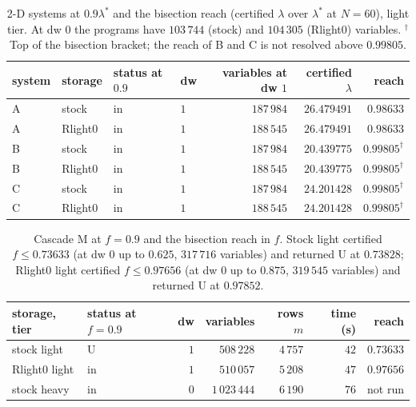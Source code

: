 \begin{table}[h]\centering\scriptsize
\setlength{\tabcolsep}{4pt}
\begin{tabular}{llllrrr}
\toprule
system & storage & status at $0.9$ & dw & variables at dw $1$ & certified $\lambda$ & reach \\
\midrule
A & stock & in & $1$ & $187\,984$ & $26.479491$ & $0.98633$ \\
A & Rlight0 & in & $1$ & $188\,545$ & $26.479491$ & $0.98633$ \\
B & stock & in & $1$ & $187\,984$ & $20.439775$ & $0.99805^{\dagger}$ \\
B & Rlight0 & in & $1$ & $188\,545$ & $20.439775$ & $0.99805^{\dagger}$ \\
C & stock & in & $1$ & $187\,984$ & $24.201428$ & $0.99805^{\dagger}$ \\
C & Rlight0 & in & $1$ & $188\,545$ & $24.201428$ & $0.99805^{\dagger}$ \\
\bottomrule
\end{tabular}
\caption{2-D systems at $0.9\lambda^*$ and the bisection reach (certified $\lambda$ over $\lambda^*$ at $N=60$), light tier. At dw $0$ the programs have $103\,744$ (stock) and $104\,305$ (Rlight0) variables. $^{\dagger}$Top of the bisection bracket; the reach of B and C is not resolved above $0.99805$.}\label{tab:bl-inhom-2d}
\end{table}

\begin{table}[h]\centering\scriptsize
\setlength{\tabcolsep}{4pt}
\begin{tabular}{llrrrrr}
\toprule
storage, tier & status at $f=0.9$ & dw & variables & rows $m$ & time (s) & reach \\
\midrule
stock light & U & $1$ & $508\,228$ & $4\,757$ & $42$ & $0.73633$ \\
Rlight0 light & in & $1$ & $510\,057$ & $5\,208$ & $47$ & $0.97656$ \\
stock heavy & in & $0$ & $1\,023\,444$ & $6\,190$ & $76$ & not run \\
\bottomrule
\end{tabular}
\caption{Cascade M at $f=0.9$ and the bisection reach in $f$. Stock light certified $f\le0.73633$ (at dw $0$ up to $0.625$, $317\,716$ variables) and returned U at $0.73828$; Rlight0 light certified $f\le0.97656$ (at dw $0$ up to $0.875$, $319\,545$ variables) and returned U at $0.97852$.}\label{tab:bl-inhom-mixed}
\end{table}

